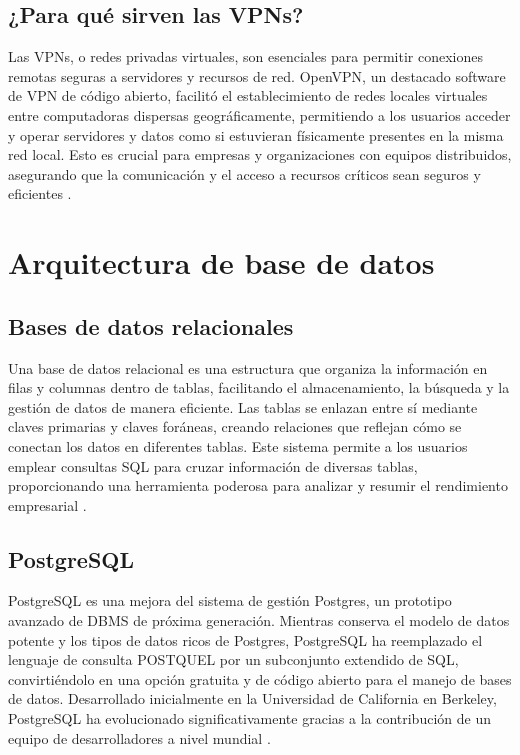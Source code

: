 \subsection{¿Para qué sirven las VPNs?}
Las VPNs, o redes privadas virtuales, son esenciales para permitir conexiones remotas seguras a servidores y recursos de red. OpenVPN, un destacado software de VPN de código abierto, facilitó el establecimiento de redes locales virtuales entre computadoras dispersas geográficamente, permitiendo a los usuarios acceder y operar servidores y datos como si estuvieran físicamente presentes en la misma red local. Esto es crucial para empresas y organizaciones con equipos distribuidos, asegurando que la comunicación y el acceso a recursos críticos sean seguros y eficientes \cite{OpenVPN}.

\section{Arquitectura de base de datos}
\subsection{Bases de datos relacionales}
Una base de datos relacional es una estructura que organiza la información en filas y columnas dentro de tablas, facilitando el almacenamiento, la búsqueda y la gestión de datos de manera eficiente. Las tablas se enlazan entre sí mediante claves primarias y claves foráneas, creando relaciones que reflejan cómo se conectan los datos en diferentes tablas. Este sistema permite a los usuarios emplear consultas SQL para cruzar información de diversas tablas, proporcionando una herramienta poderosa para analizar y resumir el rendimiento empresarial \cite{Relacionales}.

\subsection{PostgreSQL}
PostgreSQL es una mejora del sistema de gestión Postgres, un prototipo avanzado de DBMS de próxima generación. Mientras conserva el modelo de datos potente y los tipos de datos ricos de Postgres, PostgreSQL ha reemplazado el lenguaje de consulta POSTQUEL por un subconjunto extendido de SQL, convirtiéndolo en una opción gratuita y de código abierto para el manejo de bases de datos. Desarrollado inicialmente en la Universidad de California en Berkeley, PostgreSQL ha evolucionado significativamente gracias a la contribución de un equipo de desarrolladores a nivel mundial \cite{Postgres}.

